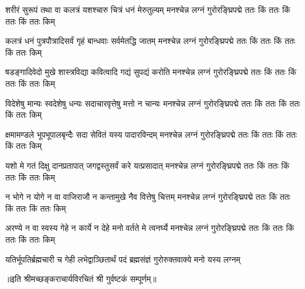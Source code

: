 

\fourlineindentedshloka
{शरीरं सुरूपं तथा वा कलत्रं}
{यशश्चारु चित्रं धनं मेरुतुल्यम्}
{मनश्चेन्न लग्नं गुरोरङ्घ्रिपद्मे}
{ततः किं ततः किं ततः किं ततः किम्}%
 

 \fourlineindentedshloka
{कलत्रं धनं पुत्रपौत्रादिसर्वं}
{गृहं बान्धवाः सर्वमेतद्धि जातम्}
{मनश्चेन्न लग्नं गुरोरङ्घ्रिपद्मे}
{ततः किं ततः किं ततः किं ततः किम्}%
 

\fourlineindentedshloka 
{षडङ्गादिवेदो मुखे शास्त्रविद्या}
{कवित्वादि गद्यं सुपद्यं करोति}
{मनश्चेन्न लग्नं गुरोरङ्घ्रिपद्मे}
{ततः किं ततः किं ततः किं ततः किम्}%
 

\fourlineindentedshloka 
{विदेशेषु मान्यः स्वदेशेषु धन्यः}
{सदाचारवृत्तेषु मत्तो न चान्यः}
{मनश्चेन्न लग्नं गुरोरङ्घ्रिपद्मे}
{ततः किं ततः किं ततः किं ततः किम्}%
 

\fourlineindentedshloka 
{क्षमामण्डले भूपभूपालबृन्दैः}
{सदा सेवितं यस्य पादारविन्दम्}
{मनश्चेन्न लग्नं गुरोरङ्घ्रिपद्मे}
{ततः किं ततः किं ततः किं ततः किम्}%
 
\fourlineindentedshloka 
{यशो मे गतं दिक्षु दानप्रतापात्}
{जगद्वस्तुसर्वं करे यत्प्रसादात्}
{मनश्चेन्न लग्नं गुरोरङ्घ्रिपद्मे}
{ततः किं ततः किं ततः किं ततः किम्}%
 
\fourlineindentedshloka 
{न भोगे न योगे न वा वाजिराजौ}
{न कन्तामुखे नैव वित्तेषु चित्तम्}
{मनश्चेन्न लग्नं गुरोरङ्घ्रिपद्मे}
{ततः किं ततः किं ततः किं ततः किम्}%
 

\fourlineindentedshloka 
{अरण्ये न वा स्वस्य गेहे न कार्ये}
{न देहे मनो वर्तते मे त्वनर्घ्ये}
{मनश्चेन्न लग्नं गुरोरङ्घ्रिपद्मे}
{ततः किं ततः किं ततः किं ततः किम्}%
 

{यतिर्भूपतिर्ब्रह्मचारी च गेही}
{लभेद्वाञ्छितार्थं पदं ब्रह्मसंज्ञं}
{गुरोरुक्तवाक्ये मनो यस्य लग्नम्}%
 

॥इति श्रीमच्छङ्कराचार्यविरचितं श्री गुर्वष्टकं सम्पूर्णम्॥